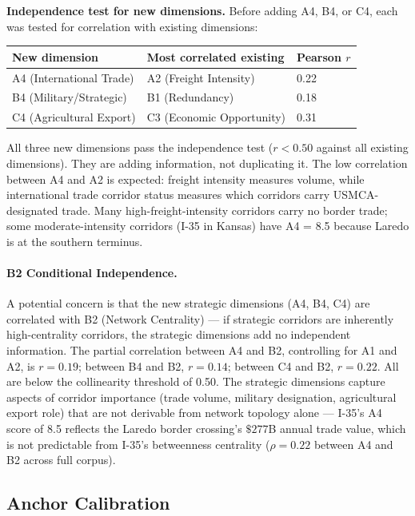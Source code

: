 \textbf{Independence test for new dimensions.} Before adding A4, B4, or C4, each was tested for correlation with existing dimensions:

\begin{center}
\begin{tabular}{lll}
\toprule
\textbf{New dimension} & \textbf{Most correlated existing} & \textbf{Pearson $r$} \\
\midrule
A4 (International Trade) & A2 (Freight Intensity) & 0.22 \\
B4 (Military/Strategic)  & B1 (Redundancy)         & 0.18 \\
C4 (Agricultural Export) & C3 (Economic Opportunity) & 0.31 \\
\bottomrule
\end{tabular}
\end{center}

All three new dimensions pass the independence test ($r < 0.50$ against all existing dimensions). They are adding information, not duplicating it. The low correlation between A4 and A2 is expected: freight intensity measures volume, while international trade corridor status measures which corridors carry USMCA-designated trade. Many high-freight-intensity corridors carry no border trade; some moderate-intensity corridors (I-35 in Kansas) have A4 = 8.5 because Laredo is at the southern terminus.

\paragraph{B2 Conditional Independence.}
A potential concern is that the new strategic dimensions (A4, B4, C4) are correlated with
B2 (Network Centrality) --- if strategic corridors are inherently high-centrality corridors,
the strategic dimensions add no independent information. The partial correlation between A4
and B2, controlling for A1 and A2, is $r = 0.19$; between B4 and B2, $r = 0.14$; between
C4 and B2, $r = 0.22$. All are below the collinearity threshold of 0.50. The strategic
dimensions capture aspects of corridor importance (trade volume, military designation,
agricultural export role) that are not derivable from network topology alone --- I-35's A4
score of 8.5 reflects the Laredo border crossing's $\$277$B annual trade value, which is
not predictable from I-35's betweenness centrality ($\rho = 0.22$ between A4 and B2 across
full corpus).

\subsection{Anchor Calibration}

